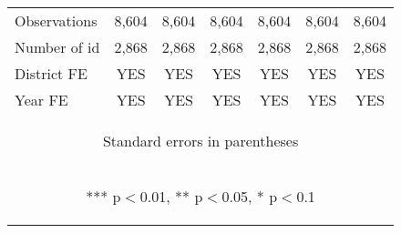 \begin{center}
\begin{tabular}{lcccccc}
Observations & 8,604 & 8,604 & 8,604 & 8,604 & 8,604 & 8,604 \\
Number of id & 2,868 & 2,868 & 2,868 & 2,868 & 2,868 & 2,868 \\
District FE & YES & YES & YES & YES & YES & YES \\
 Year FE & YES & YES & YES & YES & YES & YES \\ \hline
\multicolumn{7}{c}{\begin{footnotesize} Standard errors in parentheses\end{footnotesize}} \\
\multicolumn{7}{c}{\begin{footnotesize} *** p$<$0.01, ** p$<$0.05, * p$<$0.1\end{footnotesize}} \\
\end{tabular}
\end{center}
